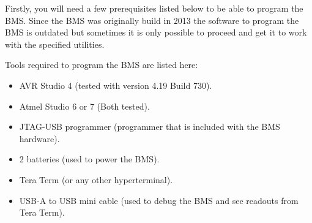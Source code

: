 Firstly, you will need a few prerequisites listed below to be able to program the BMS. Since the BMS was originally build in 2013 the software to program the BMS is outdated but sometimes it is only possible to proceed and get it to work with the specified utilities. 

Tools required to program the BMS are listed here:
	\begin{itemize}
		\item AVR Studio 4 (tested with version 4.19 Build 730).
		\item Atmel Studio 6 or 7 (Both tested).
		\item JTAG-USB programmer (programmer that is included with the BMS hardware).
		\item 2 batteries (used to power the BMS).
		\item Tera Term (or any other hyperterminal).
		\item USB-A to USB mini cable (used to debug the BMS and see readouts from Tera Term).
	\end{itemize}
	
